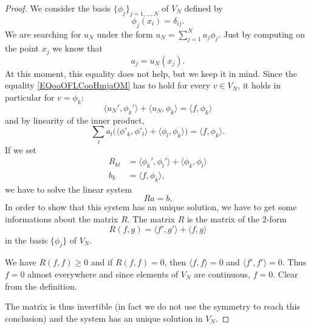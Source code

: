 \begin{proof}
	We consider the basis \( \{ \phi_j \}_{j=1,\ldots, N}\) of \( V_N\) defined by
	\begin{equation}
		\phi_j(x_i)=\delta_{ij}.
	\end{equation}
	We are searching for \( u_N\) under the form \( u_N=\sum_{j=1}^Na_j\phi_j\). Just by computing on the point \( x_j\) we know that
	\begin{equation}
		a_j=u_N(x_j).
	\end{equation}
	At this moment, this equality does not help, but we keep it in mind. Since the equality \eqref{EQooOFLCooHmjaOM} has to hold for every \( v \in V_N\), it holds in particular for \( v=\phi_k\):
	\begin{equation}
		\langle u_N', \phi_k'\rangle +\langle u_N, \phi_k\rangle =\langle f, \phi_k\rangle
	\end{equation}
	and by linearity of the inner product,
	\begin{equation}
		\sum_la_l\big( \langle \phi'_k, \phi'_l\rangle +\langle \phi_l, \phi_k\rangle  \big)=\langle f, \phi_k\rangle .
	\end{equation}
	If we set
	\begin{subequations}
		\begin{align}
			R_{kl} & =\langle \phi_k', \phi_l'\rangle +\langle \phi_k, \phi_l\rangle \\
			b_k    & =\langle f, \phi_k\rangle,
		\end{align}
	\end{subequations}
	we have to solve the linear system
	\begin{equation}
		Ra=b.
	\end{equation}
	In order to show that this system has an unique solution, we have to get some informations about the matrix \( R\). The matrix \( R\) is the matrix of the \( 2\)-form
	\begin{equation}
		R(f,g)=\langle f', g'\rangle +\langle f, g\rangle
	\end{equation}
	in the basis \( \{ \phi_j \}\) of \( V_N\).

	\begin{subproof}
		We have \( R(f,f)\geq 0\) and if \( R(f,f)=0\), then \( \langle f, f\rangle =0\) and \( \langle f', f'\rangle =0\). Thus \( f=0\) almost everywhere and since elements of \( V_N\) are continuous, \( f=0\).
		\spitem[\( R\) is symmetric] Clear from the definition.
	\end{subproof}

	The matrix is thus invertible (in fact we do not use the symmetry to reach this conclusion) and the system has an unique solution in \( V_N\).

\end{proof}


